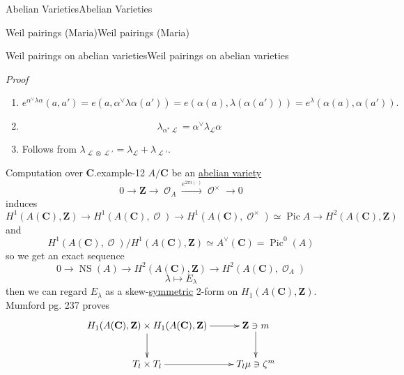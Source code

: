 \documentclass[10pt,]{book}
\makeatletter
\renewcommand*{\proofname}{Proof}
\renewenvironment{proof}[1][\proofname]{\par
  \pushQED{\qed}%
  \normalfont \topsep6\p@\@plus6\p@\relax
  \trivlist
  \item\relax
    {\itshape
    #1\@addpunct{.}}\hspace\labelsep\ignorespaces
}{%
  \popQED\endtrivlist\@endpefalse
}
\numberwithin{equation}{section}
\newcommand{\sheaf}[1]{\operatorname{\mathcal{#1}}}
\newcommand{\ZZ}{\mathbf{Z}}
\newcommand{\CC}{\mathbf{C}}
\DeclareMathOperator{\divisor}{div}
\DeclareMathOperator{\Pic}{Pic}
\DeclareMathOperator{\NS}{NS}
\makeatother
\begin{document}
\begin{chapterptx}{Abelian Varieties}{}{Abelian Varieties}{}{}
\begin{sectionptx}{Weil pairings (Maria)}{}{Weil pairings (Maria)}{}{}
\begin{subsectionptx}{Weil pairings on abelian varieties}{}{Weil pairings on abelian varieties}{}{}
\begin{proof}
\begin{enumerate}
\begin{equation*}
\divisor(g\circ \alpha) = \alpha^*\divisor (g) = \alpha^*(l^n_B)^* D = (l_A^n)^* \alpha^* D\text{.}
\end{equation*}
So%
\item\hypertarget{li-53}{}%
\begin{equation*}
e^{\alpha^{\vee}\lambda \alpha} (a,a') = e(a, \alpha^\vee\lambda \alpha(a')) = e(\alpha(a),\lambda (\alpha(a'))) = e^\lambda (\alpha(a), \alpha(a'))\text{.}
\end{equation*}
%
\item\hypertarget{li-54}{}%
\begin{equation*}
\lambda_{\alpha^* \sheaf L} = \alpha^\vee \lambda_{\sheaf L} \alpha
\end{equation*}
%
\item\hypertarget{li-55}{}Follows from \(\lambda_{\sheaf L\otimes \sheaf L'} = \lambda_{\sheaf L} + \lambda_{\sheaf L'}\).%
\end{enumerate}
%
\end{proof}
\begin{example}{Computation over \(\CC\).}{example-12}%
\hypertarget{p-308}{}%
\(A/\CC\) be an \hyperref[def-buntes-abvar]{abelian variety}%
\begin{equation*}
0\to \ZZ \to \sheaf O_A \xrightarrow{e^{2\pi i (\cdot)}} \sheaf O^\times \to 0
\end{equation*}
induces%
\begin{equation*}
H^1(A(\CC), \ZZ) \to H^1(A(\CC), \sheaf O) \to H^1(A(\CC), \sheaf O^\times) \simeq \Pic A \to H^2(A(\CC), \ZZ)
\end{equation*}
and%
\begin{equation*}
H^1(A(\CC), \sheaf O)/ H^1(A(\CC), \ZZ) \simeq A^\vee(\CC) = \Pic^0(A)
\end{equation*}
so we get an exact sequence%
\begin{equation*}
0 \to \NS(A) \to H^2 (A(\CC),\ZZ) \to H^2(A(\CC),\sheaf O_A)
\end{equation*}
%
\begin{equation*}
\lambda \mapsto E_\lambda
\end{equation*}
then we can regard \(E_\lambda\) as a skew-\hyperref[def-princ-pol]{symmetric} 2-form on \(H_1(A(\CC), \ZZ)\). Mumford pg. 237 proves%
\begin{equation*}
\xymatrix{
H_1(A(\CC), \ZZ) \times H_1(A(\CC), \ZZ) \ar[r] \ar[d] & \ZZ\ni m \ar[d] \\
T_l \times T_l \ar[r] & T_l \mu \ni \zeta^m
}
\end{equation*}

\end{example}
\end{subsectionptx}
\end{sectionptx}
\end{chapterptx}
\end{document}
